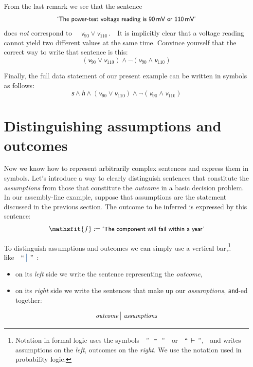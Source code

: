 \documentclass[
  a4paper,
  DIV=11,
  numbers=noendperiod,
  oneside]{scrreprt}
\providecommand{\tightlist}{%
  \setlength{\itemsep}{0pt}\setlength{\parskip}{0pt}}\usepackage{longtable,booktabs,array}
\begin{document}
From the last remark we see that the sentence \[
\textsf{\small`The power-test voltage reading is 90\,mV or 110\,mV'}
\] does \emph{not} correspond to
~~{\(\mathsfit{v}_{90} \lor \mathsfit{v}_{110}\)\,.}~~It is implicitly
clear that a voltage reading cannot yield two different values at the
same time. Convince yourself that the correct way to write that sentence
is this: \[
(\mathsfit{v}_{90} \lor \mathsfit{v}_{110})
\land
\lnot(\mathsfit{v}_{90} \land \mathsfit{v}_{110})
\]

Finally, the full data statement of our present example can be written
in symbols as follows: \[
\mathsfit{s} \land \mathsfit{h} \land
(\mathsfit{v}_{90} \lor \mathsfit{v}_{110})
\land
\lnot(\mathsfit{v}_{90} \land \mathsfit{v}_{110})
\]

\hypertarget{distinguishing-assumptions-and-outcomes}{%
\section{Distinguishing assumptions and
outcomes}\label{distinguishing-assumptions-and-outcomes}}

Now we know how to represent arbitrarily complex sentences and express
them in symbols. Let's introduce a way to clearly distinguish sentences
that constitute the \emph{assumptions} from those that constitute the
\emph{outcome} in a basic decision problem. In our assembly-line
example, suppose that assumptions are the statement discussed in the
previous section. The outcome to be inferred is expressed by this
sentence: \[
\mathsfit{f} \coloneqq \textsf{\small`The component will fail within a year'}
\]

To distinguish assumptions and outcomes we can simply use a vertical
bar,\footnote{Notation in formal logic uses the symbols~~{'' \(\models\)
  ''}~~or~~{``\,\(\vdash\)\,'',}~~and writes assumptions on the
  \emph{left}, outcomes on the \emph{right}. We use the notation used in
  probability logic.}
like~~{``\(\color[RGB]{68,119,170}\pmb{\nonscript\:\big\vert\nonscript\:\mathopen{}}\)''~:}

\begin{itemize}
\tightlist
\item
  on its \emph{left} side we write the sentence representing the
  \emph{outcome},
\item
  on its \emph{right} side we write the sentences that make up our
  \emph{assumptions}, \texttt{and}-ed together:
\end{itemize}

\[
\textit{\small outcome} \pmb{\nonscript\:\big\vert\nonscript\:\mathopen{}} \textit{\small assumptions}
\]
\end{document}
